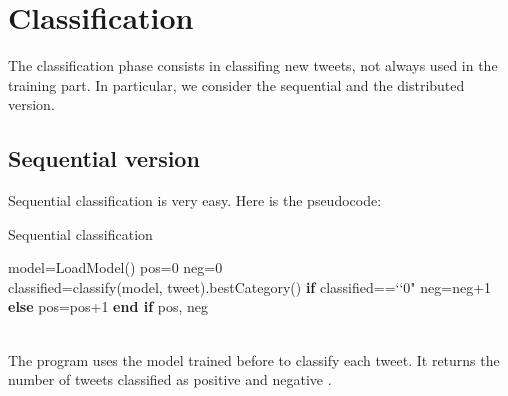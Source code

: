 \documentclass[10pt,twocolumn,letterpaper]{article}
\begin{document}
\section{Classification}
The classification phase consists in classifing new tweets, not always used in the training part. In particular, we consider the sequential and the distributed version.
\subsection{Sequential version}
Sequential classification is very easy. Here is the pseudocode:\\
\begin{algorithm}
\label{Sequential classification}
\caption{Sequential classification}
\begin{algorithmic}
\State model=LoadModel()
\State pos=0
\State neg=0
    	 \do \\
		\State classified=classify(model, tweet).bestCategory()
		\State \textbf{if}  classified==\lq\lq0"
			\State\hspace{\algorithmicindent} neg=neg+1
		\State \textbf{else} 
		\State\hspace{\algorithmicindent}pos=pos+1
		\State \textbf{end if} 
	\EndFor 	
\State \Return pos, neg
\end{algorithmic}
\end{algorithm} \\
The program uses the model trained before to classify each tweet. It returns the number of tweets classified as positive and negative .
\end{document}
